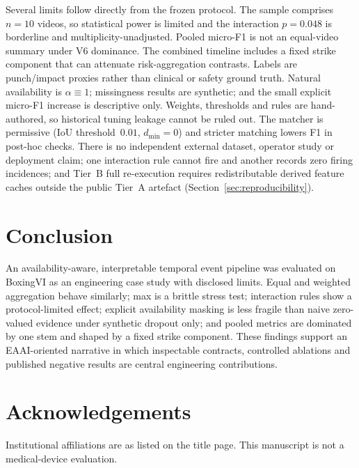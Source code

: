 \documentclass[preprint,12pt,numbers,sort&compress]{elsarticle}
\begin{document}
Several limits follow directly from the frozen protocol.
The sample comprises $n{=}10$ videos, so statistical power is limited and the interaction $p{=}0.048$ is borderline and multiplicity-unadjusted.
Pooled micro-F1 is not an equal-video summary under V6 dominance.
The combined timeline includes a fixed strike component that can attenuate risk-aggregation contrasts.
Labels are punch/impact proxies rather than clinical or safety ground truth.
Natural availability is $\alpha{\equiv}1$; missingness results are synthetic; and the small explicit micro-F1 increase is descriptive only.
Weights, thresholds and rules are hand-authored, so historical tuning leakage cannot be ruled out.
The matcher is permissive (IoU threshold~$0.01$, $d_{\min}{=}0$) and stricter matching lowers F1 in post-hoc checks.
There is no independent external dataset, operator study or deployment claim; one interaction rule cannot fire and another records zero firing incidences; and Tier~B full re-execution requires redistributable derived feature caches outside the public Tier~A artefact (Section~\ref{sec:reproducibility}).

\section{Conclusion}
\label{sec:conclusion}

An availability-aware, interpretable temporal event pipeline was evaluated on BoxingVI as an engineering case study with disclosed limits.
Equal and weighted aggregation behave similarly; max is a brittle stress test; interaction rules show a protocol-limited effect; explicit availability masking is less fragile than naive zero-valued evidence under synthetic dropout only; and pooled metrics are dominated by one stem and shaped by a fixed strike component.
These findings support an EAAI-oriented narrative in which inspectable contracts, controlled ablations and published negative results are central engineering contributions.

\section*{Acknowledgements}
Institutional affiliations are as listed on the title page.
This manuscript is not a medical-device evaluation.
\end{document}
